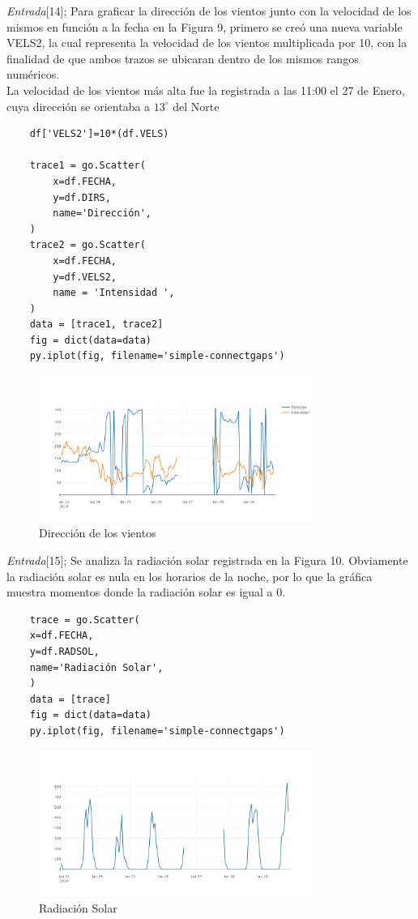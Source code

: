 \documentclass[11pt, spanish]{report}
\begin{document}
\emph{Entrada}[14]; Para graficar la dirección de los vientos junto con la velocidad de los mismos en función a la fecha en la Figura 9, primero se creó una nueva variable VELS2, la cual representa la velocidad de los vientos multiplicada por 10, con la finalidad de que ambos trazos se ubicaran dentro de los mismos rangos numéricos. 
\\
La velocidad de los vientos más alta fue la registrada a las 11:00 el 27 de Enero, cuya dirección se orientaba a $13^\circ$ del Norte
\begin{verbatim}
    df['VELS2']=10*(df.VELS)
    
    trace1 = go.Scatter(
        x=df.FECHA,
        y=df.DIRS,
        name='Dirección',
    )
    trace2 = go.Scatter(
        x=df.FECHA,
        y=df.VELS2,
        name = 'Intensidad ',
    )
    data = [trace1, trace2]
    fig = dict(data=data)
    py.iplot(fig, filename='simple-connectgaps')
\end{verbatim}
\begin{figure}[h]
\caption{Dirección de los vientos}
\centering
\includegraphics[width=0.80\textwidth]{direccion.png}
\end{figure}


\emph{Entrada}[15]; Se analiza la radiación solar registrada en la Figura 10. Obviamente la radiación solar es nula en los horarios de la noche, por lo que la gráfica muestra momentos donde la radiación solar es igual a 0.
\begin{verbatim}
    trace = go.Scatter(
    x=df.FECHA,
    y=df.RADSOL,
    name='Radiación Solar',
    )
    data = [trace]
    fig = dict(data=data)
    py.iplot(fig, filename='simple-connectgaps')
\end{verbatim}
\begin{figure}[h]
\caption{Radiación Solar}
\centering
\includegraphics[width=0.80\textwidth]{radsol.png}
\end{figure}
\end{document}
